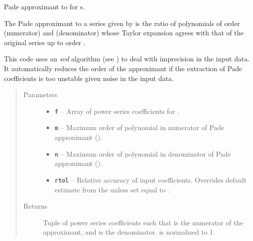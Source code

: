 \documentclass[letterpaper,10pt,english]{sphinxmanual}
\begin{document}

\begin{fulllineitems}
\label{g2tools:g2tools.pade_gvar}
\code{{[}m,n{]}} Pade approximant to  for s.

The \code{{[}m,n{]}} Pade approximant to a series given by
 is the ratio of  polynomials of order 
(numerator) and  (denominator) whose  Taylor expansion agrees
with that of the original series up to order .

This code uses an \emph{svd} algorithm (see {\hyperref[g2tools:g2tools.pade_svd]{\emph{}}}) to deal with
imprecision in the input data. It automatically reduces
the order of the approximant if the extraction of Pade coefficients
is too unstable given noise in the input data.
\begin{quote}\begin{description}
\item[{Parameters}] \leavevmode\begin{itemize}
\item {} 
\textbf{\texttt{f}} -- Array  of power series coefficients for .

\item {} 
\textbf{\texttt{m}} -- Maximum order of polynomial in numerator of Pade
approximant ().

\item {} 
\textbf{\texttt{n}} -- Maximum order of polynomial in denominator of Pade
approximant ().

\item {} 
\textbf{\texttt{rtol}} -- Relative accuracy of input coefficients. Overrides
default estimate from the  unless set equal to .

\end{itemize}

\item[{Returns}] \leavevmode
Tuple of power series coefficients  such that
 is the numerator of the approximant,
and  is the denominator.  is
normalized to 1.

\end{description}\end{quote}

\end{fulllineitems}
\end{document}
